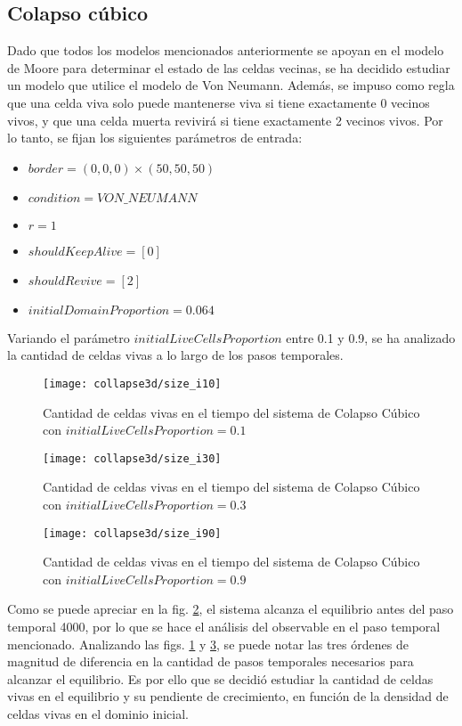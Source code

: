 \subsection{Colapso cúbico}\label{subsec:colapso-cubico}
Dado que todos los modelos mencionados anteriormente se apoyan en el modelo de Moore para determinar el estado
de las celdas vecinas, se ha decidido estudiar un modelo que utilice el modelo de Von Neumann.
Además, se impuso como regla que una celda viva solo puede mantenerse viva si tiene exactamente 0 vecinos vivos,
y que una celda muerta revivirá si tiene exactamente 2 vecinos vivos.
Por lo tanto, se fijan los siguientes parámetros de entrada:
\begin{itemize}
    \item $border = (0, 0, 0) \times (50, 50, 50)$
    \item $condition = VON\_NEUMANN$
    \item $r = 1$
    \item $shouldKeepAlive = [0]$
    \item $shouldRevive = [2]$
    \item $initialDomainProportion = 0.064$
\end{itemize}

Variando el parámetro $initialLiveCellsProportion$ entre 0.1 y 0.9, se ha analizado la cantidad de celdas vivas
a lo largo de los pasos temporales.

\begin{figure}[H]
    \centering
    \texttt{[image: collapse3d/size\_i10]}
    \caption{Cantidad de celdas vivas en el tiempo del sistema de Colapso Cúbico con $initialLiveCellsProportion = 0.1$}
    \label{fig:colapso3d_i10}
\end{figure}
\begin{figure}[H]
    \centering
    \texttt{[image: collapse3d/size\_i30]}
    \caption{Cantidad de celdas vivas en el tiempo del sistema de Colapso Cúbico con $initialLiveCellsProportion = 0.3$}
    \label{fig:colapso3d_i30}
\end{figure}
\begin{figure}[H]
    \centering
    \texttt{[image: collapse3d/size\_i90]}
    \caption{Cantidad de celdas vivas en el tiempo del sistema de Colapso Cúbico con $initialLiveCellsProportion = 0.9$}
    \label{fig:colapso3d_i90}
\end{figure}

Como se puede apreciar en la fig. \ref{fig:colapso3d_i30}, el sistema alcanza el equilibrio
antes del paso temporal 4000, por lo que se hace el análisis del observable en el paso temporal mencionado.
Analizando las figs. \ref{fig:colapso3d_i10} y \ref{fig:colapso3d_i90}, se
puede notar las tres órdenes de magnitud de diferencia en la cantidad de pasos temporales necesarios para
alcanzar el equilibrio.
Es por ello que se decidió estudiar la cantidad de celdas vivas en el equilibrio y su pendiente de crecimiento,
en función de la densidad de celdas vivas en el dominio inicial.

